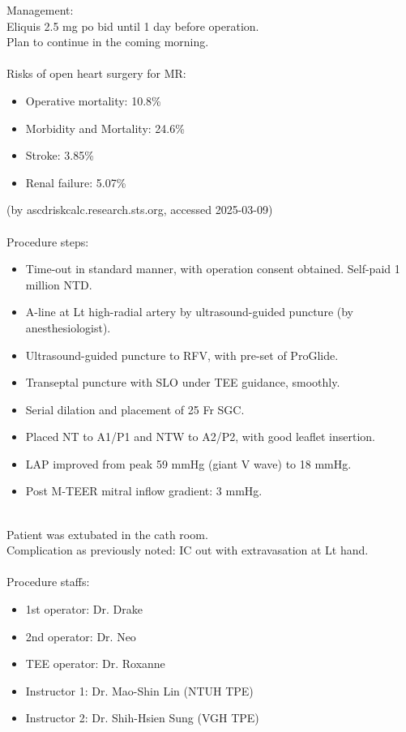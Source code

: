 \documentclass[nols]{tufte-book}
\begin{document}
Management:\\
Eliquis 2.5 mg po bid until 1 day before operation.\\
Plan to continue in the coming morning.\\
\\
Risks of open heart surgery for MR:\\
\begin{itemize}
\item Operative mortality: 10.8\%
\item Morbidity and Mortality: 24.6\%
\item Stroke: 3.85\%
\item Renal failure: 5.07\%
\end{itemize}
(by ascdriskcalc.research.sts.org, accessed 2025-03-09)\\
\\
Procedure steps:\\
\begin{itemize}
\item Time-out in standard manner, with operation consent obtained. Self-paid 1 million NTD.
\item A-line at Lt high-radial artery by ultrasound-guided puncture (by anesthesiologist).
\item Ultrasound-guided puncture to RFV, with pre-set of ProGlide.
\item Transeptal puncture with SLO under TEE guidance, smoothly.
\item Serial dilation and placement of 25 Fr SGC.
\item Placed NT to A1/P1 and NTW to A2/P2, with good leaflet insertion.
\item LAP improved from peak 59 mmHg (giant V wave) to 18 mmHg.
\item Post M-TEER mitral inflow gradient: 3 mmHg.
\end{itemize}
\\
Patient was extubated in the cath room.\\
Complication as previously noted: IC out with extravasation at Lt hand.\\
\\
Procedure staffs:\\
\begin{itemize}
    \item 1st operator: Dr. Drake
    \item 2nd operator: Dr. Neo
    \item TEE operator: Dr. Roxanne
    \item Instructor 1: Dr. Mao-Shin Lin (NTUH TPE)
    \item Instructor 2: Dr. Shih-Hsien Sung (VGH TPE)
\end{itemize}
\end{document}
